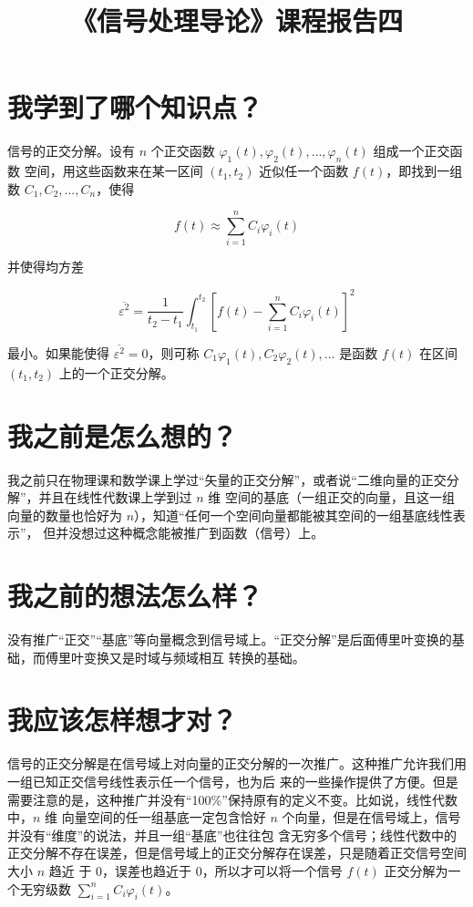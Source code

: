 \documentclass{ctexart}
\title{《信号处理导论》课程报告四}
\begin{document}
    \maketitle
    \section{我学到了哪个知识点？}

    信号的正交分解。设有 $n$ 个正交函数 $\varphi_1(t), \varphi_2(t), \ldots, \varphi_n(t)$ 组成一个正交函数
    空间，用这些函数来在某一区间 $(t_1, t_2)$ 近似任一个函数 $f(t)$，即找到一组数 $C_1, C_2, \ldots, C_n$，使得
    
    \[f(t) \approx \sum_{i=1}^{n} C_i\varphi_i(t)\]

    并使得均方差
    
    \[\overline{\varepsilon^2} = \frac{1}{t_2 - t_1}\int_{t_1}^{t_2} \left[f(t) - \sum_{i=1}^{n} C_i\varphi_i(t)\right]^2\]

    最小。如果能使得 $\overline{\varepsilon^2} = 0$，则可称 $C_1\varphi_1(t), C_2\varphi_2(t), \ldots$
    是函数 $f(t)$ 在区间 $(t_1, t_2)$ 上的一个正交分解。

    \section{我之前是怎么想的？}

    我之前只在物理课和数学课上学过``矢量的正交分解''，或者说``二维向量的正交分解''，并且在线性代数课上学到过 $n$ 维
    空间的基底（一组正交的向量，且这一组向量的数量也恰好为 $n$），知道``任何一个空间向量都能被其空间的一组基底线性表示''，
    但并没想过这种概念能被推广到函数（信号）上。

    \section{我之前的想法怎么样？}

    没有推广``正交''``基底''等向量概念到信号域上。``正交分解''是后面傅里叶变换的基础，而傅里叶变换又是时域与频域相互
    转换的基础。

    \section{我应该怎样想才对？}

    信号的正交分解是在信号域上对向量的正交分解的一次推广。这种推广允许我们用一组已知正交信号线性表示任一个信号，也为后
    来的一些操作提供了方便。但是需要注意的是，这种推广并没有``100\%''保持原有的定义不变。比如说，线性代数中，$n$ 维
    向量空间的任一组基底一定包含恰好 $n$ 个向量，但是在信号域上，信号并没有``维度''的说法，并且一组``基底''也往往包
    含无穷多个信号；线性代数中的正交分解不存在误差，但是信号域上的正交分解存在误差，只是随着正交信号空间大小 $n$ 趋近
    于 0，误差也趋近于 0，所以才可以将一个信号 $f(t)$ 正交分解为一个无穷级数 $\sum_{i=1}^{n} C_i\varphi_i(t)$。
\end{document}
